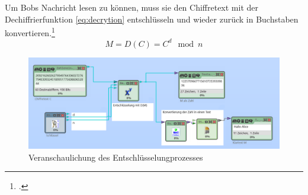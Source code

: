 \documentclass{scrarticle} %
\begin{document}
            Um Bobs Nachricht lesen zu können, muss sie den Chiffretext mit der Dechiffrierfunktion \ref{eq:decrytion} entschlüsseln und wieder zurück in Buchstaben konvertieren.\footcite[77]{ertel2003}
            \begin{equation}
                M = D(C) = C^{d}\mod{n} \label{eq:decrytion}
            \end{equation}
            \begin{figure}
                \includegraphics[width=\linewidth]{content/cryptool_decrypt_e1.png}
                \caption{Veranschaulichung des Entschlüsselungprozesses\protect\footnotemark}
                \label{fig:decrypt}
            \end{figure}

\end{document}
